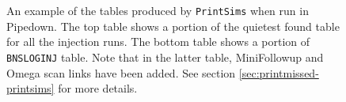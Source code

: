 \begin{figure}[p]
\center
{}
\label{fig:sample-printsims}
\caption{An example of the tables produced by \texttt{PrintSims} when run in
Pipedown. The top table shows a portion of the quietest found table for all
the injection runs. The bottom table shows a portion of \texttt{BNSLOGINJ}
table. Note that in the latter table, MiniFollowup and Omega scan links have
been added. See section \ref{sec:printmissed-printsims} for more details.}
\end{figure}

